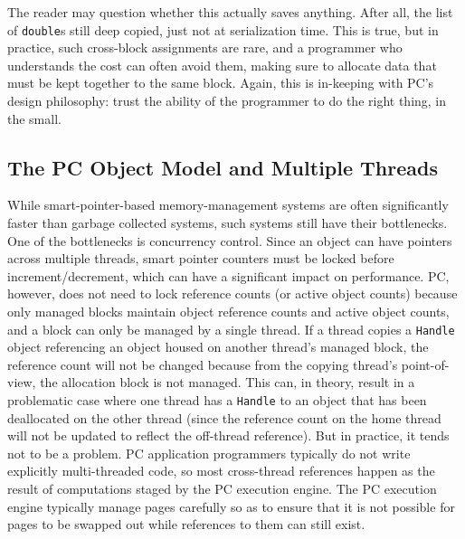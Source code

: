 The reader may question whether this actually saves anything.  After all, the list of \texttt{double}s still deep copied, just not at serialization time.
This is true, but in practice, such cross-block assignments are rare, and a programmer who understands the cost can often avoid them, making sure to allocate
data that must be kept together to the same block.
Again, this is in-keeping with PC's design philosophy: trust the ability of the programmer to do the right thing, in the small.

\subsection{The PC Object Model and Multiple Threads}

While smart-pointer-based memory-management
systems are often significantly faster than garbage collected systems, such systems still have their bottlenecks.  One of the bottlenecks is concurrency
control.
Since an object can have pointers across multiple threads, smart pointer counters must be locked before increment/decrement, which
can have a significant impact on performance.  PC, however, does not need to lock reference counts (or active object counts) because only managed blocks maintain
object reference counts and active object counts,
and a block can only be managed by a single thread.  
If a thread copies a \texttt{Handle} object referencing an object housed on another thread's managed block, 
the reference count will not be changed because from the copying thread's point-of-view, the allocation block is not managed.
This can, in theory, result in a problematic case where one thread has a \texttt{Handle} to an object that has been deallocated on the other thread (since
the reference count on the home thread will not be updated to reflect the off-thread reference).  But in practice, it tends not to be a problem.  PC application
programmers typically do not write explicitly multi-threaded code, so most cross-thread references happen as the result of computations staged by the 
PC execution engine.  The PC execution engine typically manage pages carefully so as to ensure that 
it is not possible for pages to be swapped out while references to them can still exist.


